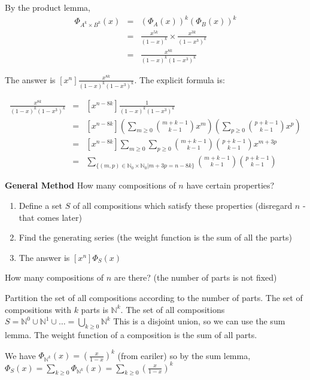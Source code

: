 \documentclass{article}
\begin{document}
By the product lemma, 
\begin{eqnarray*}
	\Phi_{A^k \times B^k}(x) &=& \left( \Phi_A(x) \right)^k \left( \Phi_B(x) \right)^k \\
	&=& \frac{x^{5k}}{(1-x)^k} \times \frac{x^{3k}}{(1-x^3)^k} \\
	&=& \frac{x^{8k}}{(1-x)^k (1-x^3)^k}
\end{eqnarray*}

The answer is $[x^n] \frac{x^{8k}}{(1-x)^k (1-x^3)^k}$. The explicit formula is:

\begin{eqnarray*}
	[x^n] \frac{x^{8k}}{(1-x)^k (1-x^3)^k} &=& [x^{n-8k}]\frac{1}{(1-x)^k (1-x^3)^k} \\
	&=& [x^{n-8k}] \left( \sum_{m \ge 0} \binom {m+k-1}{k-1}x^m \right) \left( \sum_{p \ge 0} \binom {p+k-1}{k-1}x^p \right) \\
	&=& [x^{n-8k}] \sum_{m \ge 0} \sum_{p \ge 0} \binom {m+k-1}{k-1} \binom {p+k-1}{k-1} x^{m+3p} \\
	&=& \sum_{ \{(m,p) \in \mathbb{N}_0 \times \mathbb{N}_0 | m+3p = n-8k\} } \binom {m+k-1}{k-1} \binom {p+k-1}{k-1}
\end{eqnarray*}

\textbf{General Method}
How many compositions of $n$ have certain properties?
\begin{enumerate}
	\item Define a set $S$ of all compositions which satisfy these properties (disregard $n$ - that comes later)
	\item Find the generating series (the weight function is the sum of all the parts)
	\item The answer is $[x^n]\Phi_S(x)$
\end{enumerate}

\example
How many compositions of $n$ are there? (the number of parts is not fixed)

Partition the set of all compositions according to the number of parts. The set of compositions with $k$ parts is $\mathbb{N}^k$. The set of all compositions $S= \mathbb{N}^0 \cup \mathbb{N}^1 \cup \dots = \bigcup_{k \ge 0} \mathbb{N}^k$ This is a disjoint union, so we can use the sum lemma. The weight function of a composition is the sum of all parts.

We have $\Phi_{\mathbb{N}^k}(x) = \left( \frac{x}{1-x} \right)^k$ (from eariler) so by the sum lemma, $\Phi_S(x) = \sum_{k \ge 0} \Phi_{\mathbb{N}^k}(x) = \sum_{k \ge 0} \left( \frac{x}{1-x} \right)^k$
\end{document}
